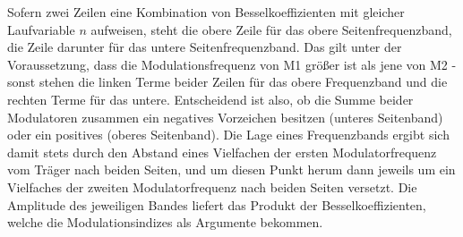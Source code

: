 Sofern zwei Zeilen eine Kombination von Besselkoeffizienten mit gleicher Laufvariable $n$ aufweisen, steht die obere Zeile für das obere Seitenfrequenzband, die Zeile darunter für das untere Seitenfrequenzband. Das gilt unter der Voraussetzung, dass die Modulationsfrequenz von M1 größer ist als jene von M2 - sonst stehen die linken Terme beider Zeilen für das obere Frequenzband und die rechten Terme für das untere. Entscheidend ist also, ob die Summe beider Modulatoren zusammen ein negatives Vorzeichen besitzen (unteres Seitenband) oder ein positives (oberes Seitenband). Die Lage eines Frequenzbands ergibt sich damit stets durch den Abstand eines Vielfachen der ersten Modulatorfrequenz vom Träger nach beiden Seiten, und um diesen Punkt herum dann jeweils um ein Vielfaches der zweiten Modulatorfrequenz nach beiden Seiten versetzt. Die Amplitude des jeweiligen Bandes liefert das Produkt der Besselkoeffizienten, welche die Modulationsindizes als Argumente bekommen. 

